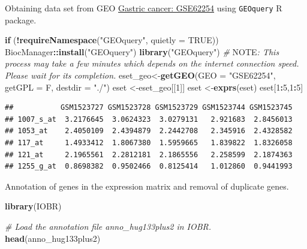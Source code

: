 \documentclass[
  12pt,
]{book}
\newenvironment{Shaded}{\begin{snugshade}}{\end{snugshade}}
\newcommand{\AlertTok}[1]{\textcolor[rgb]{0.94,0.16,0.16}{#1}}
\newcommand{\AttributeTok}[1]{\textcolor[rgb]{0.13,0.29,0.53}{#1}}
\newcommand{\CommentTok}[1]{\textcolor[rgb]{0.56,0.35,0.01}{\textit{#1}}}
\newcommand{\ConstantTok}[1]{\textcolor[rgb]{0.56,0.35,0.01}{#1}}
\newcommand{\ControlFlowTok}[1]{\textcolor[rgb]{0.13,0.29,0.53}{\textbf{#1}}}
\newcommand{\DecValTok}[1]{\textcolor[rgb]{0.00,0.00,0.81}{#1}}
\newcommand{\FunctionTok}[1]{\textcolor[rgb]{0.13,0.29,0.53}{\textbf{#1}}}
\newcommand{\NormalTok}[1]{#1}
\newcommand{\OtherTok}[1]{\textcolor[rgb]{0.56,0.35,0.01}{#1}}
\newcommand{\SpecialCharTok}[1]{\textcolor[rgb]{0.81,0.36,0.00}{\textbf{#1}}}
\newcommand{\StringTok}[1]{\textcolor[rgb]{0.31,0.60,0.02}{#1}}
\begin{document}
Obtaining data set from GEO \href{https://pubmed.ncbi.nlm.nih.gov/25894828/}{Gastric cancer: GSE62254} using \texttt{GEOquery} R package.

\begin{Shaded}
\begin{Highlighting}[]
\ControlFlowTok{if}\NormalTok{ (}\SpecialCharTok{!}\FunctionTok{requireNamespace}\NormalTok{(}\StringTok{"GEOquery"}\NormalTok{, }\AttributeTok{quietly =} \ConstantTok{TRUE}\NormalTok{))  BiocManager}\SpecialCharTok{::}\FunctionTok{install}\NormalTok{(}\StringTok{"GEOquery"}\NormalTok{)}
\FunctionTok{library}\NormalTok{(}\StringTok{"GEOquery"}\NormalTok{)}
\CommentTok{\# }\AlertTok{NOTE}\CommentTok{: This process may take a few minutes which depends on the internet connection speed. Please wait for its completion.}
\NormalTok{eset\_geo}\OtherTok{\textless{}{-}}\FunctionTok{getGEO}\NormalTok{(}\AttributeTok{GEO     =} \StringTok{"GSE62254"}\NormalTok{, }\AttributeTok{getGPL  =}\NormalTok{ F, }\AttributeTok{destdir =} \StringTok{"./"}\NormalTok{)}
\NormalTok{eset    }\OtherTok{\textless{}{-}}\NormalTok{eset\_geo[[}\DecValTok{1}\NormalTok{]]}
\NormalTok{eset    }\OtherTok{\textless{}{-}}\FunctionTok{exprs}\NormalTok{(eset)}
\NormalTok{eset[}\DecValTok{1}\SpecialCharTok{:}\DecValTok{5}\NormalTok{,}\DecValTok{1}\SpecialCharTok{:}\DecValTok{5}\NormalTok{]}
\end{Highlighting}
\end{Shaded}

\begin{verbatim}
##           GSM1523727 GSM1523728 GSM1523729 GSM1523744 GSM1523745
## 1007_s_at  3.2176645  3.0624323  3.0279131   2.921683  2.8456013
## 1053_at    2.4050109  2.4394879  2.2442708   2.345916  2.4328582
## 117_at     1.4933412  1.8067380  1.5959665   1.839822  1.8326058
## 121_at     2.1965561  2.2812181  2.1865556   2.258599  2.1874363
## 1255_g_at  0.8698382  0.9502466  0.8125414   1.012860  0.9441993
\end{verbatim}

Annotation of genes in the expression matrix and removal of duplicate genes.

\begin{Shaded}
\begin{Highlighting}[]
\FunctionTok{library}\NormalTok{(IOBR)}

\CommentTok{\# Load the annotation file \textasciigrave{}anno\_hug133plus2\textasciigrave{} in IOBR.}
\FunctionTok{head}\NormalTok{(anno\_hug133plus2)}
\end{Highlighting}
\end{Shaded}
\end{document}
